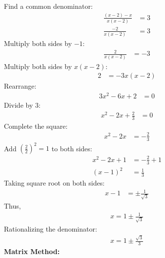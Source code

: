 \documentclass[journal]{IEEEtran}
\begin{document}
Find a common denominator:
\begin{align}
    \frac{(x-2) - x}{x(x-2)} &= 3 \\
    \frac{-2}{x(x-2)} &= 3
\end{align}
Multiply both sides by $-1$:
\begin{align}
    \frac{2}{x(x-2)} &= -3
\end{align}
Multiply both sides by $x(x-2)$:
\begin{align}
    2 &= -3x(x-2)
\end{align}
Rearrange:
\begin{align}
    3x^2 - 6x + 2 &= 0
\end{align}
Divide by 3:
\begin{align}
    x^2 - 2x + \frac{2}{3} &= 0
\end{align}
Complete the square:
\begin{align}
    x^2 - 2x &= -\frac{2}{3}
\end{align}
Add $\left(\frac{2}{2}\right)^2 = 1$ to both sides:
\begin{align}
    x^2 - 2x + 1 &= -\frac{2}{3} + 1 \\
    (x-1)^2 &= \frac{1}{3}
\end{align}
Taking square root on both sides:
\begin{align}
    x - 1 &= \pm \frac{1}{\sqrt{3}}
\end{align}
Thus,
\begin{align}
    x = 1 \pm \frac{1}{\sqrt{3}}
\end{align}
Rationalizing the denominator:
\begin{align}
    x = 1 \pm \frac{\sqrt{3}}{3}
\end{align}
\textbf{Matrix Method:}
\end{document}
